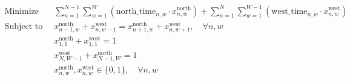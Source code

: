 \documentclass{article}
\begin{document}
\begin{align*}
\text{Minimize} \quad & \sum_{n=1}^{N-1} \sum_{w=1}^{W} \left( \text{north\_time}_{n,w} \cdot x_{n,w}^{\text{north}} \right) + \sum_{n=1}^{N} \sum_{w=1}^{W-1} \left( \text{west\_time}_{n,w} \cdot x_{n,w}^{\text{west}} \right) \\
\text{Subject to} \quad & x_{n-1,w}^{\text{north}} + x_{n,w-1}^{\text{west}} = x_{n+1,w}^{\text{north}} + x_{n,w+1}^{\text{west}}, \quad \forall n, w \\
& x_{1,1}^{\text{north}} + x_{1,1}^{\text{west}} = 1 \\
& x_{N,W-1}^{\text{west}} + x_{N-1,W}^{\text{north}} = 1 \\
& x_{n,w}^{\text{north}}, x_{n,w}^{\text{west}} \in \{0, 1\}, \quad \forall n, w
\end{align*}
\end{document}
